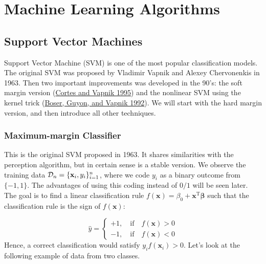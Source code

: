 \documentclass[
]{book}
\theoremstyle{definition}
\theoremstyle{definition}
\theoremstyle{definition}
\theoremstyle{definition}
\theoremstyle{remark}
\begin{document}
\hypertarget{part-machine-learning-algorithms}{%
\part{Machine Learning Algorithms}\label{part-machine-learning-algorithms}}

\hypertarget{support-vector-machines}{%
\chapter{Support Vector Machines}\label{support-vector-machines}}

Support Vector Machine (SVM) is one of the most popular classification models. The original SVM was proposed by Vladimir Vapnik and Alexey Chervonenkis in 1963. Then two important improvements was developed in the 90's: the soft margin version (\protect\hyperlink{ref-cortes1995support}{Cortes and Vapnik 1995}) and the nonlinear SVM using the kernel trick (\protect\hyperlink{ref-boser1992training}{Boser, Guyon, and Vapnik 1992}). We will start with the hard margin version, and then introduce all other techniques.

\hypertarget{maximum-margin-classifier}{%
\section{Maximum-margin Classifier}\label{maximum-margin-classifier}}

This is the original SVM proposed in 1963. It shares similarities with the perception algorithm, but in certain sense is a stable version. We observe the training data \({\cal D}_n = \{\mathbf{x}_i, y_i\}_{i=1}^n\), where we code \(y_i\) as a binary outcome from \(\{-1, 1\}\). The advantages of using this coding instead of \(0/1\) will be seen later. The goal is to find a linear classification rule \(f(\mathbf{x}) = \beta_0 + \mathbf{x}^\text{T}\boldsymbol \beta\) such that the classification rule is the sign of \(f(\mathbf{x})\):

\[
\hat{y} = 
\begin{cases}
        +1, \quad \text{if} \quad f(\mathbf{x}) > 0\\ 
        -1, \quad \text{if} \quad f(\mathbf{x}) < 0
\end{cases}
\]
Hence, a correct classification would satisfy \(y_i f(\mathbf{x}_i) > 0\). Let's look at the following example of data from two classes.
\end{document}
